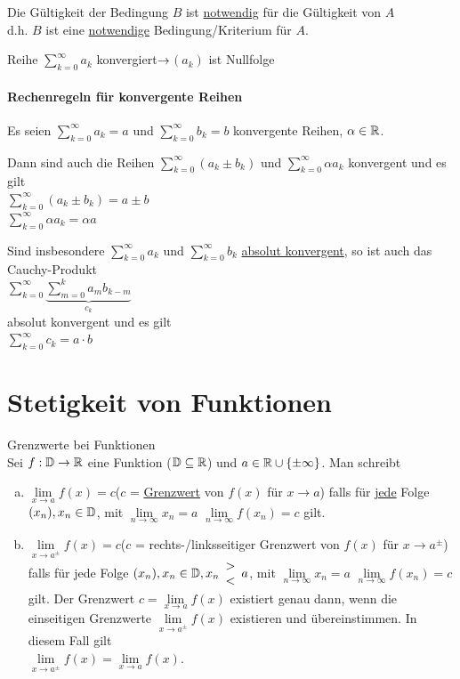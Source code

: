 Die Gültigkeit der Bedingung $B$ ist \ul{notwendig} für die Gültigkeit von $A$\\
d.h. $B$ ist eine \ul{notwendige} Bedingung/Kriterium für $A$.

{\flqq Reihe $\sum\limits_{k=0}^{\infty}a_k$ konvergiert\frqq}$\rightarrow${\flqq $(a_k)$ ist Nullfolge\frqq}

\subsubsection{Rechenregeln für konvergente Reihen}
Es seien $\sum\limits_{k=0}^{\infty}a_k = a$ und $\sum\limits_{k=0}^{\infty}b_k = b$ konvergente Reihen, $\alpha\in\mathbb{R}$.

Dann sind auch die Reihen $\sum\limits_{k=0}^{\infty}(a_k\pm b_k)$ und $\sum\limits_{k=0}^{\infty}\alpha a_k$ konvergent und es gilt\\ $\sum\limits_{k=0}^{\infty}(a_k\pm b_k) = a\pm b$\\
$\sum\limits_{k=0}^{\infty}\alpha a_k = \alpha a$

Sind insbesondere $\sum\limits_{k=0}^{\infty}a_k$ und $\sum\limits_{k=0}^{\infty}b_k$ \ul{absolut konvergent}, so ist auch das Cauchy-Produkt\\
$\sum\limits_{k=0}^{\infty}\underbrace{\sum\limits_{m=0}^{k}a_mb_{k-m}}_{c_k}$\\
absolut konvergent und es gilt\\
$\sum\limits_{k=0}^{\infty}c_k = a\cdot b$

\clearpage
\chapter{Stetigkeit von Funktionen}
\Def Grenzwerte bei Funktionen\\
Sei $f:\mathbb{D}\to\mathbb{R}$ eine Funktion ($\mathbb{D}\subseteq\mathbb{R}$) und $a\in\mathbb{R}\cup\{\pm\infty\}$. Man schreibt
\begin{enumerate}[a)]
	\item $\lim\limits_{x\to a}f(x) = c$\qquad($c$ = \ul{Grenzwert} von $f(x)$ für $x\to a$) falls für \ul{jede} Folge $(x_n),x_n\in\mathbb{D}$, mit $\lim\limits_{n\to\infty}x_n=a$ $\lim\limits_{n\to\infty}f(x_n)=c$ gilt.
	
	\item $\lim\limits_{x\to a^\pm}f(x)=c$\qquad($c$ = rechts-/linksseitiger Grenzwert von $f(x)$ für $x\to a^\pm$) falls für jede Folge $(x_n), x_n\in\mathbb{D}, x_n\begin{array}{c}>\\<\end{array}a$, mit $\lim\limits_{n\to\infty}x_n = a$ $\lim\limits_{n\to\infty}f(x_n)=c$ gilt.
	\Bem Der Grenzwert $c = \lim\limits_{x\to a}f(x)$ existiert genau dann, wenn die einseitigen Grenzwerte $\lim\limits_{x\to a^\pm}f(x)$ existieren und übereinstimmen. In diesem Fall gilt\\
	$\lim\limits_{x\to a^\pm}f(x) = \lim\limits_{x\to a}f(x)$.
\end{enumerate}

